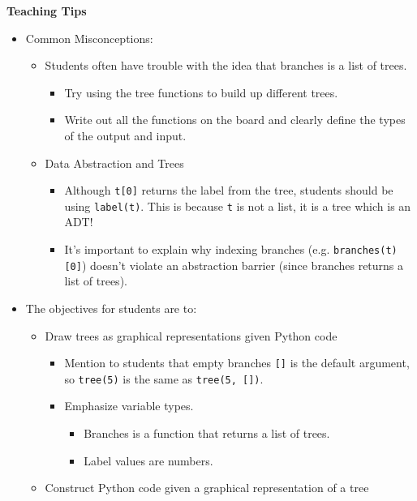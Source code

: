 \begin{guide}
	\begin{blocksection}
	\textbf{Teaching Tips}
	\begin{itemize}
			\item Common Misconceptions:
			\begin{itemize}
				\item Students often have trouble with the idea that branches is a list of trees.
				\begin{itemize}
					\item Try using the tree functions to build up different trees.
					\item Write out all the functions on the board and clearly define the types of the output and input.
				\end{itemize}
				\item Data Abstraction and Trees
				\begin{itemize}
					\item Although \lstinline{t[0]} returns the label from the tree, students should be using \lstinline{label(t)}. This is because \lstinline{t} is not a list, it is a tree which is an ADT!
					\item It’s important to explain why indexing branches (e.g. \lstinline{branches(t)[0]}) doesn't violate an abstraction barrier (since branches returns a list of trees).
				\end{itemize}
			\end{itemize}
			\item The objectives for students are to:
			\begin{itemize}
				\item Draw trees as graphical representations given Python code
				\begin{itemize}
					\item Mention to students that empty branches \lstinline{[]} is the default argument, so \lstinline{tree(5)} is the same as \lstinline{tree(5, [])}.
					\item Emphasize variable types.
					\begin{itemize}
						\item Branches is a function that returns a list of trees.
						\item Label values are numbers.
					\end{itemize}
				\end{itemize}
				\item Construct Python code given a graphical representation of a tree
			\end{itemize}
	\end{itemize}
	\end{blocksection}
\end{guide}
